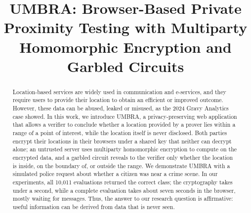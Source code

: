 \documentclass[conference,letterpaper]{IEEEtran}
\begin{document}
\title{UMBRA: Browser-Based Private Proximity Testing with Multiparty Homomorphic Encryption and Garbled Circuits}

\author{%
\and
{}
\and
{}
\and
{}
}

\maketitle

\begin{abstract}
Location-based services are widely used in communication and e-services, and they require users to provide their location to obtain an efficient or improved outcome. However, these data can be abused, leaked or misused, as the 2024 Gravy Analytics case showed. In this work, we introduce UMBRA, a privacy-preserving web application that allows a verifier to conclude whether a location provided by a prover lies within a range of a point of interest, while the location itself is never disclosed. Both parties encrypt their locations in their browsers under a shared key that neither can decrypt alone; an untrusted server uses multiparty homomorphic encryption to compute on the encrypted data, and a garbled circuit reveals to the verifier only whether the location is inside, on the boundary of, or outside the range. We demonstrate UMBRA with a simulated police request about whether a citizen was near a crime scene. In our experiments, all 10,011 evaluations returned the correct class; the cryptography takes under a second, while a complete evaluation takes about seven seconds in the browser, mostly waiting for messages. Thus, the answer to our research question is affirmative: useful information can be derived from data that is never seen.
\end{abstract}
\end{document}
